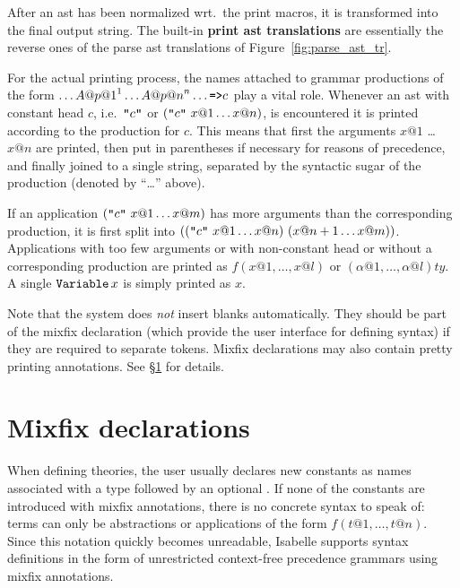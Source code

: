 \medskip
After an ast has been normalized wrt.\ the print macros, it is transformed
into the final output string. The built-in {\bf print ast
translations} are essentially the reverse
ones of the parse ast translations of Figure~\ref{fig:parse_ast_tr}.

For the actual printing process, the names attached to grammar productions of
the form $\ldots A@{p@1}^1 \ldots A@{p@n}^n \ldots \mbox{\tt =>} c$ play a vital
role. Whenever an ast with constant head $c$, i.e.\ $\mbox{\tt "}c\mbox{\tt "}$ or
$(\mbox{\tt "}c\mbox{\tt "}~ x@1 \ldots x@n)$, is encountered it is printed according to
the production for $c$. This means that first the arguments $x@1$ \dots $x@n$
are printed, then put in parentheses if necessary for reasons of precedence,
and finally joined to a single string, separated by the syntactic sugar of
the production (denoted by ``\dots'' above).

If an application $(\mbox{\tt "}c\mbox{\tt "}~ x@1 \ldots x@m)$ has more arguments than the
corresponding production, it is first split into $((\mbox{\tt "}c\mbox{\tt "}~ x@1 \ldots
x@n)~ (x@{n+1} \ldots x@m))$. Applications with too few arguments or with
non-constant head or without a corresponding production are printed as
$f(x@1, \ldots, x@l)$ or $(\alpha@1, \ldots, \alpha@l) ty$. A single
$\mathop{\mbox{\tt Variable}}\nolimits x$ is simply printed as $x$.

Note that the system does {\em not} insert blanks automatically. They should
be part of the mixfix declaration (which provide the user interface for
defining syntax) if they are required to separate tokens. Mixfix declarations
may also contain pretty printing annotations. See \S\ref{sec:mixfix} for
details.



\section{Mixfix declarations} \label{sec:mixfix}

When defining theories, the user usually declares new constants as names
associated with a type followed by an optional .
If none of the constants are introduced with mixfix annotations, there is no
concrete syntax to speak of: terms can only be abstractions or applications
of the form $f(t@1, \dots, t@n)$. Since this notation quickly becomes
unreadable, Isabelle supports syntax definitions in the form of unrestricted
context-free  
precedence grammars using mixfix annotations.

